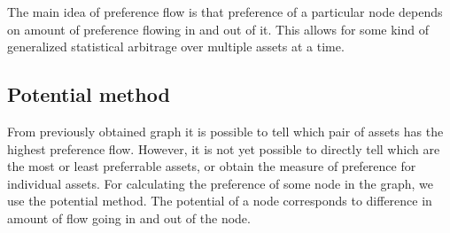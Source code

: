 \documentclass[letterpaper, 10 pt, conference]{ieeeconf}
\begin{document}
  The main idea of preference flow is that preference of a particular node depends on amount of preference flowing in and out of it.
  This allows for some kind of generalized statistical arbitrage over multiple assets at a time.
   
  \subsection{Potential method}
  \label{sub:potential}
  From previously obtained graph it is possible to tell which pair of assets has the highest preference flow.
  However, it is not yet possible to directly tell which are the most or least preferrable assets, or obtain the measure of preference for individual assets.
  For calculating the preference of some node in the graph, we use the potential method\cite{caklovic}.
  The potential of a node corresponds to difference in amount of flow going in and out of the node.
  
\end{document}
